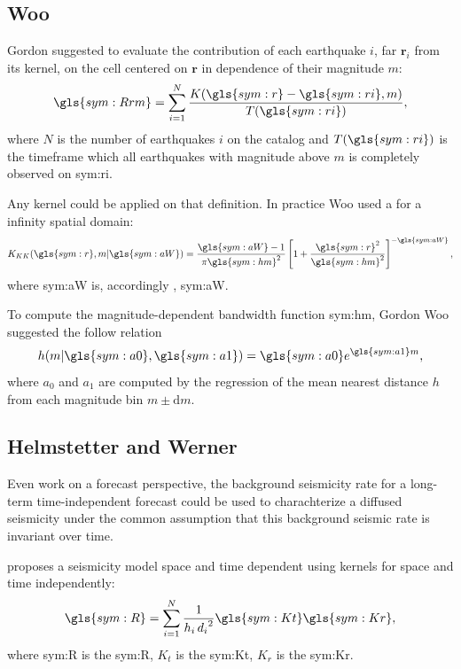 \documentclass[draft, grl]{agutex}
\begin{document}
\begin{article}
\subsection{Woo}

Gordon \citet{woo_1996} suggested to evaluate the contribution of each earthquake $i$, far $\boldsymbol{r}_i$ from its kernel, on the cell centered on $\boldsymbol{r}$ in dependence of their magnitude $m$:
\begin{equation}
	\ensuremath{
		\gls{sym:Rrm} = \sum_{i=1}^{N} \frac{ K(\gls{sym:r} - \gls{sym:ri}, m)}
											{T({\gls{sym:ri})}},
	}
	\label{eq:Rrm}
\end{equation}
where $N$ is the number of earthquakes $i$ on the catalog
and $T(\gls{sym:ri})$ is the timeframe which all earthquakes with magnitude above $m$ is completely observed on \gls{sym:ri}.


Any kernel could be applied on that definition. In practice Woo used a \citet{kagan_knopoff_1980} for a infinity spatial domain:
\begin{equation}
	\ensuremath{
		K_{KK}(\gls{sym:r}, m \arrowvert \gls{sym:aW}) =  \frac{  \gls{sym:aW}  -1}{\pi\gls{sym:hm}^2}
							\left[ 1 + \frac{\gls{sym:r}^2}{\gls{sym:hm}^2} \right]^{-\gls{sym:aW}},
	}
	\label{eq:k_kj}
\end{equation}
where \gls{sym:aW} is, accordingly \citet{verejones_1992}, \glsdesc{sym:aW}.


To compute the magnitude-dependent bandwidth function \gls{sym:hm}, Gordon Woo suggested the follow relation
\begin{equation}
	\ensuremath{
		h(m\arrowvert \gls{sym:a0}, \gls{sym:a1}) = \gls{sym:a0}e^{\gls{sym:a1}m},
	}
	\label{eq:hm}
\end{equation}
where $a_0$ and $a_1$ are computed by the regression of the mean nearest distance $h$ from each magnitude bin $m \pm \mathrm{d}m$.



\subsection{Helmstetter and Werner}


Even work on a forecast perspective, the background seismicity rate for a long-term time-independent forecast could be used to charachterize a diffused seismicity under the common assumption that this background seismic rate is invariant over time.

\citet{helmstetter_2012} proposes a seismicity model space and time dependent using kernels for space and time independently:
\begin{equation}
	\ensuremath{\gls{sym:R} = \sum_{i=1}^{N}{ \frac{1}{h_i\,{d_i}^2} \gls{sym:Kt}\gls{sym:Kr} }},
	\label{eq:helms01}
\end{equation}
where \gls{sym:R} is the \glsdesc{sym:R},
	  $K_t$ is the \glsdesc{sym:Kt},
	  $K_r$ is the \glsdesc{sym:Kr}.



\end{article}
\end{document}
